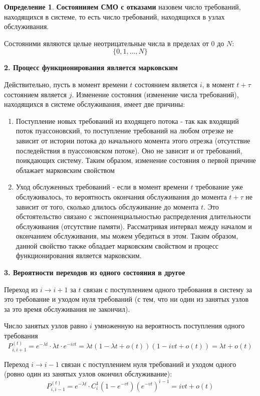 \documentclass[aps,%
12pt,%
final,%
oneside,
onecolumn,%
musixtex, %
superscriptaddress,%
centertags]{article} %
\theoremstyle{plain}
\theoremstyle{definition}
\newtheorem{definition}{Определение}[subsection]
\theoremstyle{remark}
\begin{document}
\begin{definition}
	\textbf{Состоянияем СМО с отказами} назовем число требований, находящихся в системе, то есть число требований, находящихся в узлах обслуживания. 

	Состояними являются целые неотрицательные числа в пределах от $0$ до $N$:
	$$\{0,1,\ldots,N\}$$
\end{definition}

\textbf{2. Процесс функционирования является марковским}

Действительно, пусть в момент времени $t$ состоянием является $i$, в момент $t + \tau$ состоянием является $j$. Изменение состояния (изменение числа требований), находящихся в системе обслуживания, имеет две причины:
\begin{enumerate}
	\item Поступление новых требований из входящего потока - так как входящий поток пуассоновский, то поступление требований на любом отрезке не зависит от истории потока до начального момента этого отрезка (отсутствие последействия в пуассоновском потоке). Оно не зависит и от требований, поикдающих систему. Таким образом, изменение состояния о первой причине облажает марковским свойством
	\item Уход обслуженных требований - если в момент времени $t$ требование уже обслуживалось, то вероятность окончания обслуживания до момента $t + \tau$ не зависит от того, сколько длилось обслуживание до момента $t$. Это обстоятельство связано с экспоненциальностью распределения длительности обслуживания (отсутствие памяти). Рассматривая интервал между началом и окончанием обслуживания, мы можем убедиться в этом. Таким образом, данной свойство также обладает марковским свойством и процесс функционирования является марковским.
\end{enumerate}

\textbf{3. Вероятности переходов из одного состояния в другое}

Переход из $i \to i+1$ за $t$ связан с поступлением одного требования в систему за это требование и уходом нуля требований (с тем, что ни один из занятых узлов за это время обслуживания не закончил).

Число занятых узлов равно $i$ умноженную на вероятность поступления одного требования
$$P_{i,i+1}^{(t)} = e^{-\lambda t} \cdot \lambda t \cdot e^{-ivt} = \lambda t (1-\lambda t + o(t))(1-ivt+o(t)) = \lambda t + o(t)$$

Переход $i \to i-1$ связан с поступлением нуля требований и уходом одного (ровно один из занятых узлов окончил обслуживание):
$$P_{i,i-1}^{(t)} = e^{-\lambda t}\cdot C_i^1 (1-e^{-vt})\left(e^{-vt}\right)^{i-1} = ivt + o(t)$$
\end{document}
